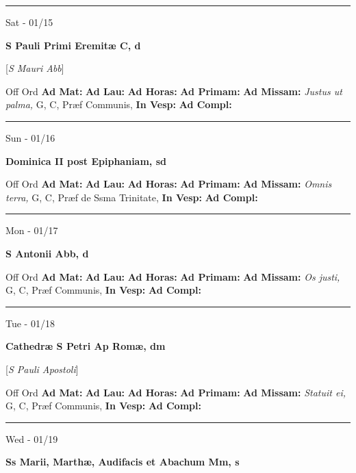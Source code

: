 \documentclass[letterpaper, 10pt]{article}
\begin{document}
\hrule
\begin{center}
Sat - 01/15
\end{center}\textbf{ \large S Pauli Primi Eremitæ C, \textnormal{\normalsize d}}

[\textit{S Mauri Abb}]
\begin{justify}
Off Ord
\textbf{Ad Mat: }
\textbf{Ad Lau: }
\textbf{Ad Horas: }
\textbf{Ad Primam: }
\textbf{Ad Missam:} \textit{Justus ut palma, } G, C, Præf Communis, 
\textbf{In Vesp: }
\textbf{Ad Compl: }\end{justify}



\hrule
\begin{center}
Sun - 01/16
\end{center}\textbf{ \large Dominica II post Epiphaniam, \textnormal{\normalsize sd}}
\begin{justify}
Off Ord
\textbf{Ad Mat: }
\textbf{Ad Lau: }
\textbf{Ad Horas: }
\textbf{Ad Primam: }
\textbf{Ad Missam:} \textit{Omnis terra, } G, C, Præf de Ssma Trinitate, 
\textbf{In Vesp: }
\textbf{Ad Compl: }\end{justify}



\hrule
\begin{center}
Mon - 01/17
\end{center}\textbf{ \large S Antonii Abb, \textnormal{\normalsize d}}
\begin{justify}
Off Ord
\textbf{Ad Mat: }
\textbf{Ad Lau: }
\textbf{Ad Horas: }
\textbf{Ad Primam: }
\textbf{Ad Missam:} \textit{Os justi, } G, C, Præf Communis, 
\textbf{In Vesp: }
\textbf{Ad Compl: }\end{justify}



\hrule
\begin{center}
Tue - 01/18
\end{center}\textbf{ \large Cathedræ S Petri Ap Romæ, \textnormal{\normalsize dm}}

[\textit{S Pauli Apostoli}]
\begin{justify}
Off Ord
\textbf{Ad Mat: }
\textbf{Ad Lau: }
\textbf{Ad Horas: }
\textbf{Ad Primam: }
\textbf{Ad Missam:} \textit{Statuit ei, } G, C, Præf Communis, 
\textbf{In Vesp: }
\textbf{Ad Compl: }\end{justify}



\hrule
\begin{center}
Wed - 01/19
\end{center}\textbf{ \large Ss Marii, Marthæ, Audifacis et Abachum Mm, \textnormal{\normalsize s}}
\end{document}

